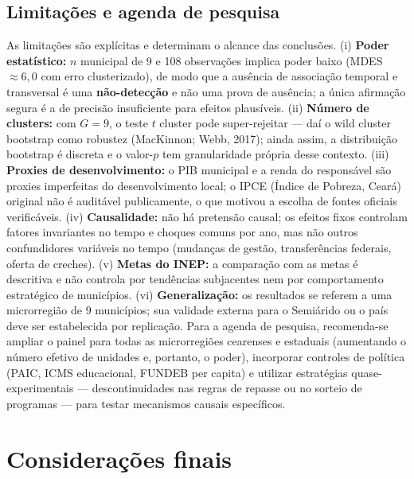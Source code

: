 \documentclass[12pt,a4paper]{article}
\begin{document}
\subsection{Limitações e agenda de pesquisa}

As limitações são explícitas e determinam o alcance das conclusões. (i) \textbf{Poder estatístico:} $n$ municipal de 9 e 108 observações implica poder baixo (MDES $\approx 6{,}0$ com erro clusterizado), de modo que a ausência de associação temporal e transversal é uma \textbf{não-detecção} e não uma prova de ausência; a única afirmação segura é a de precisão insuficiente para efeitos plausíveis. (ii) \textbf{Número de clusters:} com $G = 9$, o teste $t$ cluster pode super-rejeitar --- daí o wild cluster bootstrap como robustez (MacKinnon; Webb, 2017); ainda assim, a distribuição bootstrap é discreta e o valor-$p$ tem granularidade própria desse contexto. (iii) \textbf{Proxies de desenvolvimento:} o PIB municipal e a renda do responsável são proxies imperfeitas do desenvolvimento local; o IPCE (Índice de Pobreza, Ceará) original não é auditável publicamente, o que motivou a escolha de fontes oficiais verificáveis. (iv) \textbf{Causalidade:} não há pretensão causal; os efeitos fixos controlam fatores invariantes no tempo e choques comuns por ano, mas não outros confundidores variáveis no tempo (mudanças de gestão, transferências federais, oferta de creches). (v) \textbf{Metas do INEP:} a comparação com as metas é descritiva e não controla por tendências subjacentes nem por comportamento estratégico de municípios. (vi) \textbf{Generalização:} os resultados se referem a uma microrregião de 9 municípios; sua validade externa para o Semiárido ou o país deve ser estabelecida por replicação. Para a agenda de pesquisa, recomenda-se ampliar o painel para todas as microrregiões cearenses e estaduais (aumentando o número efetivo de unidades e, portanto, o poder), incorporar controles de política (PAIC, ICMS educacional, FUNDEB per capita) e utilizar estratégias quase-experimentais --- descontinuidades nas regras de repasse ou no sorteio de programas --- para testar mecanismos causais específicos.

\section{Considerações finais}
\end{document}
